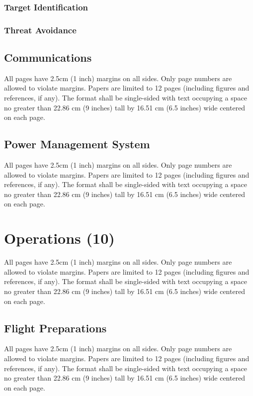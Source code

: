 \documentclass[12pt, letterpaper]{article}
\begin{document}
\subsubsection{Target Identification}

\subsubsection{Threat Avoidance}

\subsection{Communications}
All pages have 2.5cm (1 inch) margins on all sides. Only page numbers are allowed to violate margins. Papers are limited to 12 pages (including figures and references, if any). The format shall be single-sided with text occupying a space no greater than 22.86 cm (9 inches) tall by 16.51 cm (6.5 inches) wide centered on each page.

\subsection{Power Management System}
All pages have 2.5cm (1 inch) margins on all sides. Only page numbers are allowed to violate margins. Papers are limited to 12 pages (including figures and references, if any). The format shall be single-sided with text occupying a space no greater than 22.86 cm (9 inches) tall by 16.51 cm (6.5 inches) wide centered on each page.

\section{Operations (10)}
All pages have 2.5cm (1 inch) margins on all sides. Only page numbers are allowed to violate margins. Papers are limited to 12 pages (including figures and references, if any). The format shall be single-sided with text occupying a space no greater than 22.86 cm (9 inches) tall by 16.51 cm (6.5 inches) wide centered on each page.

\subsection{Flight Preparations}
All pages have 2.5cm (1 inch) margins on all sides. Only page numbers are allowed to violate margins. Papers are limited to 12 pages (including figures and references, if any). The format shall be single-sided with text occupying a space no greater than 22.86 cm (9 inches) tall by 16.51 cm (6.5 inches) wide centered on each page.
\end{document}

